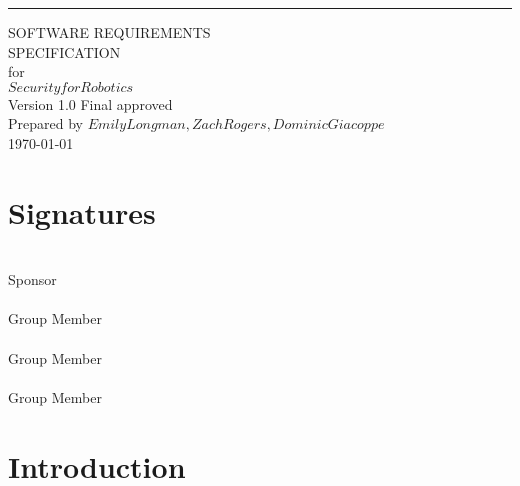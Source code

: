 \documentclass{scrreprt}
\date{}
\def\myversion{1.0 Final }
\begin{document}
\begin{flushright}
    \rule{16cm}{5pt}\vskip1cm
    \begin{bfseries}
        \Huge{SOFTWARE REQUIREMENTS\\ SPECIFICATION}\\
        \vspace{1.9cm}
        for\\
        \vspace{1.9cm}
        $Security for Robotics$\\
        \vspace{1.9cm}
        \LARGE{Version \myversion approved}\\
        \vspace{1.9cm}
        Prepared by $Emily Longman, Zach Rogers, Dominic Giacoppe$\\
        \vspace{1.9cm}
        \today\\
    \end{bfseries}
\end{flushright}

\tableofcontents

\chapter{Signatures}
\vspace{2in}
\makebox[2.5in]{\hrulefill} \hspace {1.0in}\makebox[2.5in]{\hrulefill} \\
Sponsor  \\

\vspace{.2in}
\makebox[2.5in]{\hrulefill} \hspace {1.0in}\makebox[2.5in]{\hrulefill} \\
Group Member  \\

\vspace{.2in}
\makebox[2.5in]{\hrulefill} \hspace {1.0in}\makebox[2.5in]{\hrulefill} \\
Group Member  \\

\vspace{.2in}
\makebox[2.5in]{\hrulefill} \hspace {1.0in}\makebox[2.5in]{\hrulefill} \\
Group Member  \\


\chapter{Introduction}
\end{document}
